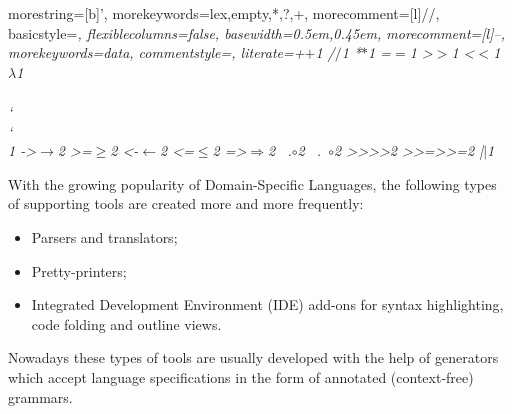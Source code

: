 \documentclass{IOS-Book-Article}     %
\newcommand{\bad}[1]{\textcolor{red}{#1}}
\renewcommand{\bad}[1]{#1}
\begin{document}
	{
		morestring=[b]',
		morekeywords={lex,empty,*,?,+},
		morecomment=[l]{//},
	}
    {
      basicstyle=\small\it\rmfamily,%
      flexiblecolumns=false,
      basewidth={0.5em,0.45em},
  	  morecomment=[l]{--},
  	  morekeywords={data},
	  commentstyle=\normalfont\ttfamily\color{OliveGreen},
      literate={+}{{$+$}}1 {/}{{$/$}}1 {*}{{$*$}}1 {=}{{$=$}}1
               {>}{{$>$}}1 {<}{{$<$}}1 {\\}{{$\lambda$}}1
               {\\\\}{{\char`\\\char`\\}}1
               {->}{{$\rightarrow$}}2 {>=}{{$\geq$}}2 {<-}{{$\leftarrow$}}2
               {<=}{{$\leq$}}2 {=>}{{$\Rightarrow$}}2 
               {\ .}{{$\circ$}}2 {\ .\ }{{$\circ$}}2
               {>>}{{>>}}2 {>>=}{{>>=}}2
               {|}{{$\mid$}}1               
    }

With the growing popularity of Domain-Specific Languages, the following types of supporting tools are created \bad{more and} more frequently:
\begin{itemize}
	\item Parsers and translators;
	\item Pretty-printers;
	\item Integrated Development Environment (IDE) add-ons for syntax highlighting, code folding and outline views.
\end{itemize}
Nowadays these types of tools are usually developed with the help of generators which accept language specifications in the form of annotated (context-free) grammars. 
\end{document}

